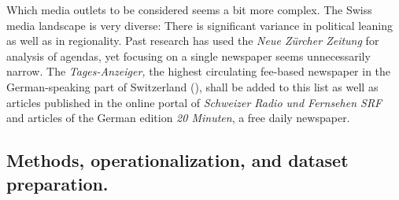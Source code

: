 \documentclass[11pt,a4paper]{article}
\begin{document}
Which media outlets to be considered seems a bit more complex. The Swiss media landscape is very diverse: There is significant variance in political leaning as well as in regionality. Past research has used the \textit{Neue Zürcher Zeitung} for analysis of agendas, yet focusing on a single newspaper seems unnecessarily narrow. The \textit{Tages-Anzeiger,} the highest circulating fee-based newspaper in the German-speaking part of Switzerland (\cite{presence_switzerland_media_2018}), shall be added to this list as well as articles published in the online portal of \textit{Schweizer Radio und Fernsehen SRF} and articles of the German edition \textit{20 Minuten}, a free daily newspaper.

\subsection{Methods, operationalization, and dataset preparation.}
\end{document}
